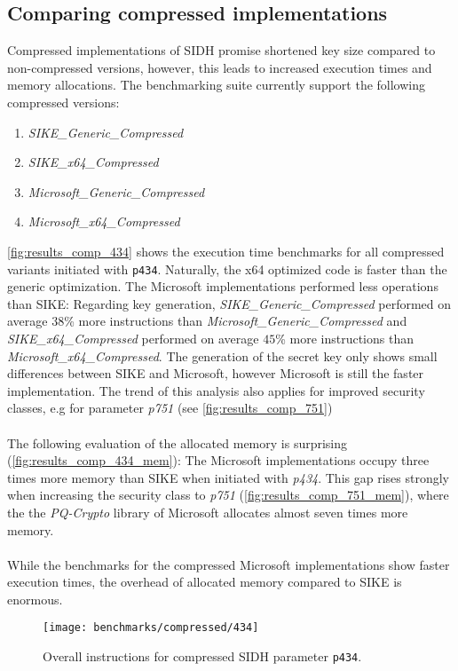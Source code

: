 \subsection{Comparing compressed implementations}\label{sec:analysis_compressed}
Compressed implementations of SIDH promise shortened key size compared to non-compressed versions, however, this leads to increased execution times and memory allocations. The benchmarking suite currently support the following compressed versions:
\begin{enumerate}
\item \textit{SIKE\_Generic\_Compressed}
\item \textit{SIKE\_x64\_Compressed}
\item \textit{Microsoft\_Generic\_Compressed}
\item \textit{Microsoft\_x64\_Compressed}
\end{enumerate}
\autoref{fig:results_comp_434} shows the execution time benchmarks for all compressed variants initiated with \texttt{p434}. Naturally, the x64 optimized code is faster than the generic optimization. The Microsoft implementations performed less operations than SIKE: Regarding key generation, \textit{SIKE\_Generic\_Compressed} performed on average $38$\% more instructions than \textit{Microsoft\_Generic\_Compressed} and \textit{SIKE\_x64\_Compressed} performed on average $45$\% more instructions than \textit{Microsoft\_x64\_Compressed}. The generation of the secret key only shows small differences between SIKE and Microsoft, however Microsoft is still the faster implementation. The trend of this analysis also applies for improved security classes, e.g for parameter \textit{p751} (see \autoref{fig:results_comp_751})
\\\\
The following evaluation of the allocated memory is surprising (\autoref{fig:results_comp_434_mem}): The Microsoft implementations occupy three times more memory than SIKE when initiated with \textit{p434}. This gap rises strongly when increasing the security class to \textit{p751} (\autoref{fig:results_comp_751_mem}), where the the \textit{PQ-Crypto} library of Microsoft allocates almost seven times more memory.
\\\\
While the benchmarks for the compressed Microsoft implementations show faster execution times, the overhead of allocated memory compared to SIKE is enormous.

\begin{figure}[H]
  \centering
  \texttt{[image: benchmarks/compressed/434]}
  \caption[Overall instructions compressed p434]
  {Overall instructions for compressed SIDH parameter \texttt{p434}.}
  \label{fig:results_comp_434}
\end{figure}

